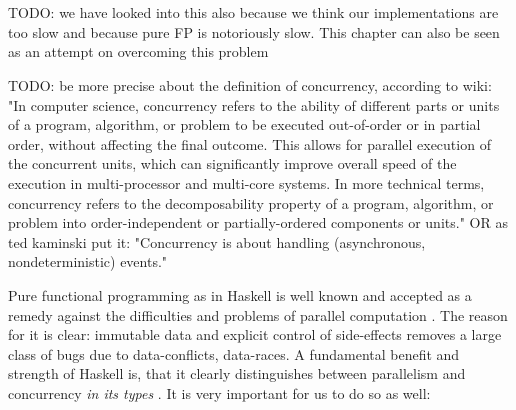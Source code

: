 \chapter*{} %
\label{ch:parallel_abs}
TODO: we have looked into this also because we think our implementations are too slow and because pure FP is notoriously slow. This chapter can also be seen as an attempt on overcoming this problem 

TODO: be more precise about the definition of concurrency, according to wiki: "In computer science, concurrency refers to the ability of different parts or units of a program, algorithm, or problem to be executed out-of-order or in partial order, without affecting the final outcome. This allows for parallel execution of the concurrent units, which can significantly improve overall speed of the execution in multi-processor and multi-core systems. In more technical terms, concurrency refers to the decomposability property of a program, algorithm, or problem into order-independent or partially-ordered components or units."
OR as ted kaminski put it: "Concurrency is about handling (asynchronous, nondeterministic) events."

Pure functional programming as in Haskell is well known and accepted as a remedy against the difficulties and problems of parallel computation \cite{hudak_history_2007}. The reason for it is clear: immutable data and explicit control of side-effects removes a large class of bugs due to data-conflicts, data-races. A fundamental benefit and strength of Haskell is, that it clearly distinguishes between parallelism and concurrency \textit{in its types} \cite{jones_tackling_2002}. It is very important for us to do so as well:

